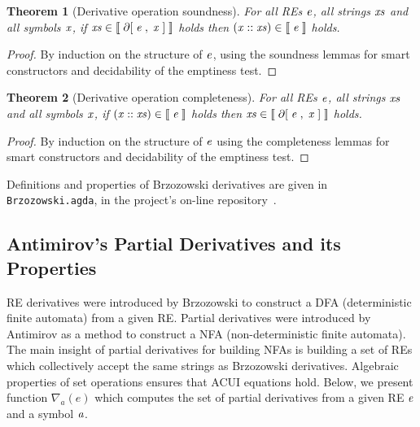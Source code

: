 \documentclass[fleqn,10pt]{SelfArx} %
\newtheorem{Theorem}{Theorem}
\theoremstyle{definition}
\newcommand{\D}[1]{\blue{\mathsf{#1}}}
\newcommand{\C}[1]{\red{\mathsf{#1}}}
\newcommand{\F}[1]{\green{\mathsf{#1}}}
\newcommand{\V}[1]{\purple{\mathit{#1}}}
\begin{document}
\begin{Theorem}[Derivative operation soundness]\label{derivsound}
For all REs \ensuremath{\V{e}}, all strings \ensuremath{\V{xs}} and all symbols \ensuremath{\V{x}}, if
\ensuremath{\V{xs}\;\D{\in\llbracket}\;\F{\partial[}\;\V{e}\;\red{,}\,\;\V{x}\;\F{]}\;\D{\rrbracket}} holds then \ensuremath{(\V{x}\;\C{::}\;\V{xs})\;\D{\in\llbracket}\;\V{e}\;\D{\rrbracket}} holds.
\end{Theorem}
\begin{proof}
  By induction on the structure of \ensuremath{\V{e}}, using the soundness
  lemmas for smart constructors and decidability of the emptiness
  test.
\end{proof}

\begin{Theorem}[Derivative operation completeness]\label{derivcomplete}
For all REs \ensuremath{\V{e}}, all strings \ensuremath{\V{xs}} and all symbols \ensuremath{\V{x}}, if
\ensuremath{(\V{x}\;\C{::}\;\V{xs})\;\D{\in\llbracket}\;\V{e}\;\D{\rrbracket}} holds then \ensuremath{\V{xs}\;\D{\in\llbracket}\;\F{\partial[}\;\V{e}\;\red{,}\,\;\V{x}\;\F{]}\;\D{\rrbracket}} holds.
\end{Theorem}
\begin{proof}
  By induction on the structure of \ensuremath{\V{e}} using the completeness
  lemmas for smart constructors and decidability of the emptiness
  test.
\end{proof}

Definitions and properties of Brzozowski derivatives are given in
\texttt{Brzozowski.agda}, in the project's on-line
repository~\cite{regex-rep}.

\subsection{Antimirov's Partial Derivatives and its Properties}

RE derivatives were introduced by Brzozowski to construct a DFA (deterministic
finite automata) from a given RE. Partial derivatives were introduced by
Antimirov as a method to construct a NFA (non-deterministic finite automata).
The main insight of partial derivatives for building NFAs is building a set
of REs which collectively accept the same strings as Brzozowski derivatives.
Algebraic properties of set operations ensures that ACUI equations hold.
Below, we present function $\nabla_a(e)$ which computes the set of partial
derivatives from a given RE \ensuremath{\V{e}} and a symbol \ensuremath{\V{a}}.
\end{document}
